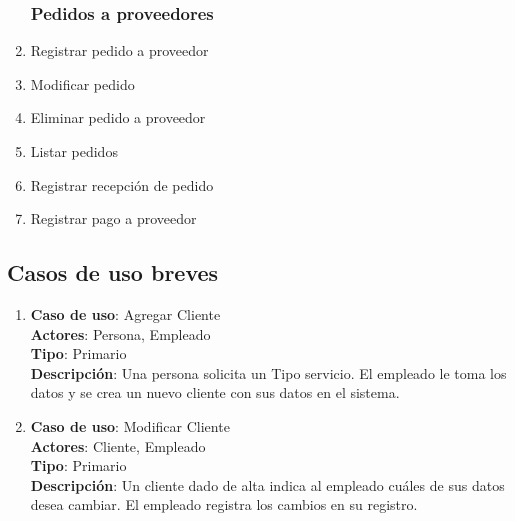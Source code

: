 \documentclass[12pt]{extarticle}
\begin{document}
\begin{spacing}{1.2}
\begin{multicols}{2}
\begin{enumerate}
        \subsubsection*{Pedidos a proveedores}
            \item Registrar pedido a proveedor
            \item Modificar pedido 
            \item Eliminar pedido a proveedor
            \item Listar pedidos
            \item Registrar recepción de pedido
            \item Registrar pago a proveedor
    \end{enumerate}
    \end{multicols}

    \clearpage

    \subsection{Casos de uso breves}


    \begin{enumerate}



        \subsubsection{Clientes}



        \item 	\textbf{Caso de uso}: Agregar Cliente\\
                \textbf{Actores}: Persona, Empleado\\
                \textbf{Tipo}: Primario\\
                \textbf{Descripción}: Una persona solicita un Tipo servicio. El empleado le toma los datos y se crea un nuevo cliente con sus datos en el sistema.

        \item 	\textbf{Caso de uso}: Modificar Cliente\\
                \textbf{Actores}: Cliente, Empleado\\
                \textbf{Tipo}: Primario\\
                \textbf{Descripción}: Un cliente dado de alta indica al empleado cuáles de sus datos desea cambiar. El empleado registra los cambios en su registro.


\end{enumerate}
\end{spacing}
\end{document}
